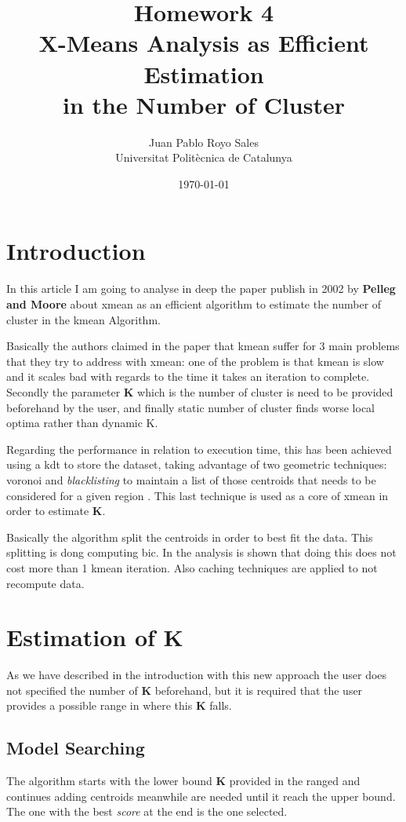 \documentclass[12pt, a4paper]{article}
\title{%
      Homework 4 \\
      X-Means Analysis as Efficient Estimation \\
      in the Number of Cluster
}
\author{%
  Juan Pablo Royo Sales\\
  \small{Universitat Politècnica de Catalunya}
}
\date\today
\begin{document}
\maketitle

\medskip

\section{Introduction}
In this article I am going to analyse in deep the paper publish in 2002 by \textbf{Pelleg and Moore} about \acrfull{xmean} \cite{xmean} as an efficient algorithm to estimate the number of cluster in the \acrfull{kmean} Algorithm.

Basically the authors claimed in the paper that \acrshort{kmean} suffer for 3 main problems that they try to address with \acrshort{xmean}: one of the problem is that \acrshort{kmean} is slow and it scales bad with regards to the time it takes an iteration to complete. Secondly the parameter \textbf{K} which is the number of cluster is need to be provided beforehand by the user, and finally static number of cluster finds worse local optima rather than dynamic K.

Regarding the performance in relation to execution time, this has been achieved using a \acrfull{kdt} to store the dataset, taking advantage of two geometric techniques: \acrfull{voronoi} \cite{geometric_2} and \textit{blacklisting} to maintain a list of those centroids that needs to be considered for a given region \cite{geometric}. This last technique is used as a core of \acrshort{xmean} in order to estimate \textbf{K}.

Basically the algorithm split the centroids in order to best fit the data. This splitting is dong computing \acrfull{bic}. In the analysis is shown that doing this does not cost more than 1 \acrshort{kmean} iteration. Also caching techniques are applied to not recompute data.


\section{Estimation of K}
As we have described in the introduction with this new approach the user does not specified the number of \textbf{K} beforehand, but it is required that the user provides a possible range in where this \textbf{K} falls.

\subsection{Model Searching}
The algorithm starts with the lower bound \textbf{K} provided in the ranged and continues adding centroids meanwhile are needed until it reach the upper bound. The one with the best \textit{score} at the end is the one selected.
\end{document}
